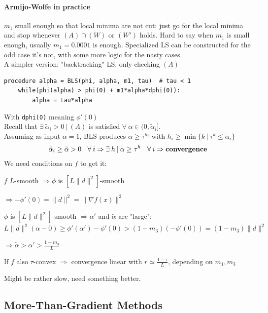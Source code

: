 \documentclass[10pt]{report}
\begin{document}
\paragraph{Armijo-Wolfe in practice} $m_1$ small enough so that local minima are not cut: just go for the local minima and stop whenever $(A)\cap (W)$ or $(W')$ holds. Hard to say when $m_1$ is small enough, usually $m_1 = 0.0001$ is enough. Specialized LS can be constructed for the odd case it's not, with some more logic for the nasty cases.\\
A simpler version: "backtracking" LS, only checking $(A)$
\begin{lstlisting}[style=myPython]
procedure alpha = BLS(phi, alpha, m1, tau)  # tau < 1
	while(phi(alpha) > phi(0) + m1*alpha*dphi(0)):
		alpha = tau*alpha
\end{lstlisting}
With \texttt{dphi(0)} meaning $\phi'(0)$\\
Recall that $\exists\:\tilde{\alpha}_i > 0\:|\:(A)$ is satisfied $\forall\:\alpha\in(0,\tilde{\alpha}_i]$.\\Assuming as input $\alpha = 1$, BLS produces $\alpha\geq \tau^{h_i}$ with $h_i\geq \min\{k\:|\:\tau^k\leq \tilde{\alpha}_i\}$
$$\tilde{\alpha}_i \geq \tilde{\alpha} > 0\:\:\:\:\forall\:i\Rightarrow\exists\:h\:|\:\alpha\geq\tau^h\:\:\:\:\forall\:i\Rightarrow \text{\textbf{convergence}}$$
We need conditions on $f$ to get it:
\begin{list}{}{}
	\item $f$ $L$-smooth $\Rightarrow \phi$ is $[L\|d\|^2]$-smooth
	\item $\Rightarrow -\phi'(0) = \|d\|^2 = \|\nabla f(x)\|^2$
	\item $\phi$ is $[L\|d\|^2]$-smooth $\Rightarrow \alpha'$ and $\tilde{\alpha}$ are "large":\\
	$L\|d\|^2(\alpha - 0)\geq \phi'(\alpha')-\phi'(0) > (1-m_3)(-\phi'(0)) = (1-m_3)\|d\|^2$
	\item $\Rightarrow \tilde{\alpha} > \alpha' > \frac{1-m_3}{L}$
	\item If $f$ also $\tau$-convex $\Rightarrow$ convergence linear with $r\simeq \frac{1-\tau}{L}$, depending on $m_1,m_3$
\end{list}
Might be rather slow, need something better.
\subsection{More-Than-Gradient Methods}
\end{document}

